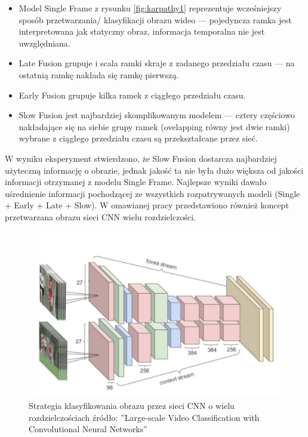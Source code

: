 \begin{itemize}
\item Model Single Frame z rysunku \ref{fig:karpathy1} reprezentuje wcześniejszy sposób przetwarzania/ klasyfikacji obrazu wideo --- pojedyncza ramka jest interpretowana jak statyczny obraz, informacja temporalna nie jest uwzględniana. 
\item Late Fusion grupuje i scala ramki skraje z zadanego przedziału czasu --- na ostatnią ramkę nakłada się ramkę pierwszą.

\item Early Fusion grupuje kilka ramek z ciągłego przedziału czasu.
\item Slow Fusion jest najbardziej skomplikowanym modelem --- cztery częściowo nakładające się na siebie grupy ramek (ovelapping równy jest dwie ramki) wybrane z ciągłego przedziału czasu są przekształcane przez sieć.
\end{itemize}
W wyniku eksperyment stwierdzono, że Slow Fusion dostarcza najbardziej użyteczną informację o obrazie, jednak jakość ta nie była dużo większa od jakości informacji otrzymanej z modelu Single Frame. Najlepsze wyniki dawało uśrednienie informacji pochodzącej ze wszystkich rozpatrywanych modeli (Single + Early + Late + Slow).
W omawianej pracy przedstawiono również koncept przetwarzana obrazu sieci CNN wielu rozdzielczości.
\begin{figure}[ht]
    \centering
    \includegraphics[width=\textwidth]{fig/multi_res.pdf}
    \caption{Strategia klasyfikowania obrazu przez sieci CNN o wielu rozdzielczościach źródło: ''Large-scale Video Classification with Convolutional Neural Networks''}
    \label{fig:multi_resKa}
\end{figure}

